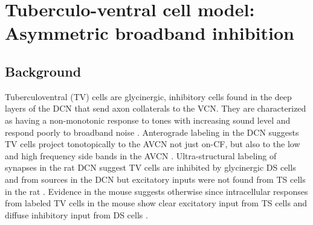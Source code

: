 
\graphicspath{{/media/data/Work/cnstellate/TV_notch/}{/media/data/Work/Responses/}{/media/data/Work/cnstellate/}{/media/data/Work/thesis/ans2010/gfx/}}
\newpage
\section[TV Cell Model]{Tuberculo-ventral cell model: Asymmetric broadband inhibition }
\label{sec:tv-cell-model}

\subsection{Background}

Tuberculoventral (TV) cells are glycinergic, inhibitory cells found in
the deep layers of the DCN that send axon collaterals to the VCN\@. They
are characterized as having a non-monotonic response to tones with
increasing sound level and respond poorly to broadband noise
\citep{SpirouDavisEtAl:1999,NelkenYoung:1997,ReissYoung:2005}.
Anterograde labeling in the DCN suggests TV cells project
tonotopically to the AVCN not just on-CF, but also to the low and high
frequency side bands in the AVCN
\citep{MunirathinamOstapoffEtAl:2004,OstapoffMorestEtAl:1999}.
Ultra-structural labeling of synapses in the rat DCN suggest TV cells
are inhibited by glycinergic DS cells and from sources in the DCN but
excitatory inputs were not found from TS cells in the rat
\citep{Rubio:2005}. Evidence in the mouse suggests otherwise since
intracellular responses from labeled TV cells in the mouse show clear
excitatory input from TS cells and diffuse inhibitory input from DS
cells \citep{ZhangOertel:1993b,WickesbergOertel:1993}.



